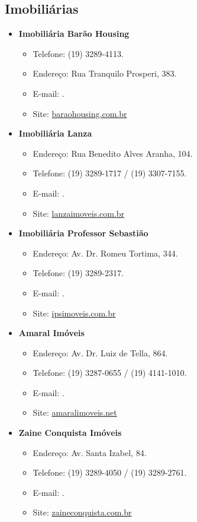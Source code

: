 \subsection{Imobiliárias}

\begin{itemize}
\item  \textbf{Imobiliária Barão Housing}
\begin{itemize}
\item  Telefone: (19) 3289-4113.
\item  Endereço: Rua Tranquilo Prosperi, 383.
\item  E-mail: .
\item  Site: \url{baraohousing.com.br}
\end{itemize}

\item  \textbf{Imobiliária Lanza}
\begin{itemize}
\item  Endereço: Rua Benedito Alves Aranha, 104.
\item  Telefone: (19) 3289-1717 / (19) 3307-7155.
\item  E-mail: .
\item  Site: \url{lanzaimoveis.com.br}
\end{itemize}

\item  \textbf{Imobiliária Professor Sebastião}
\begin{itemize}
\item  Endereço: Av. Dr. Romeu Tortima, 344.
\item  Telefone: (19) 3289-2317.
\item  E-mail: .
\item  Site: \url{ipsimoveis.com.br}
\end{itemize}

\item  \textbf{Amaral Imóveis}
\begin{itemize}
\item  Endereço: Av. Dr. Luiz de Tella, 864.
\item  Telefone: (19) 3287-0655 / (19) 4141-1010.
\item  E-mail: .
\item  Site: \url{amaralimoveis.net}
\end{itemize}

\item  \textbf{Zaine Conquista Imóveis}
\begin{itemize}
\item  Endereço: Av. Santa Izabel, 84.
\item  Telefone: (19) 3289-4050 / (19) 3289-2761.
\item  E-mail: .
\item  Site: \url{zaineconquista.com.br}
\end{itemize}


\end{itemize}
